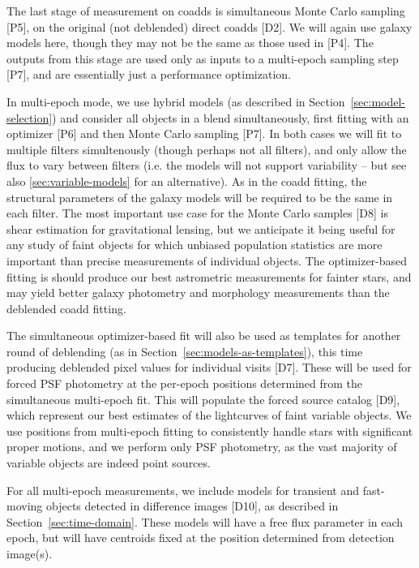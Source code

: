 \documentclass[10pt]{article}
\begin{document}
The last stage of measurement on coadds is simultaneous Monte Carlo sampling
[P5], on the original (not deblended) direct coadds [D2].  We will again use
galaxy models here, though they may not be the same as those used in [P4].
The outputs from this stage are used only as inputs to a multi-epoch
sampling step [P7], and are essentially just a performance optimization.

In multi-epoch mode, we use hybrid models (as described in
Section~\ref{sec:model-selection}) and consider all objects in a blend
simultaneously, first fitting with an optimizer [P6] and then Monte Carlo
sampling [P7].  In both cases we will fit to multiple filters simultenously
(though perhaps not all filters), and only allow the flux to vary between
filters (i.e. the models will not support variability -- but see also
\ref{sec:variable-models} for an alternative).  As in the coadd fitting, the
structural parameters of the galaxy models will be required to be the same in
each filter.  The most important use case for the Monte Carlo samples [D8] is
shear estimation for gravitational lensing, but we anticipate it being useful
for any study of faint objects for which unbiased population statistics are
more important than precise measurements of individual objects.  The
optimizer-based fitting is should produce our best astrometric measurements
for fainter stars, and may yield better galaxy photometry and morphology
measurements than the deblended coadd fitting.

The simultaneous optimizer-based fit will also be used as templates for
another round of deblending (as in Section~\ref{sec:models-as-templates}),
this time producing deblended pixel values for individual visits [D7].  These
will be used for forced PSF photometry at the per-epoch positions determined
from the simultaneous multi-epoch fit.  This will populate the forced source
catalog [D9], which represent our best estimates of the lightcurves of
faint variable objects.  We use positions from multi-epoch fitting to
consistently handle stars with significant proper motions, and we perform only
PSF photometry, as the vast majority of variable objects are indeed point
sources.

For all multi-epoch measurements, we include models for transient and fast-
moving objects detected in difference images [D10], as described in
Section~\ref{sec:time-domain}. These models will have a free flux
parameter in each epoch, but will have centroids fixed at the position
determined from detection image(s).
\end{document}
